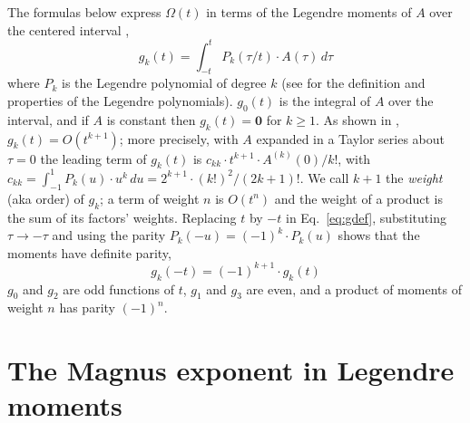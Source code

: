 \documentclass[12pt]{article}
\begin{document}
The formulas below express $\Omega(t)$ in terms of the Legendre moments of $A$ over the centered interval \cite{jtut},
\begin{equation}
g_{k}(t)=\int_{-t}^{t}P_{k}(\tau/t)\cdot A(\tau)\,d\tau\label{eq:gdef}
\end{equation}
where $P_k$ is the Legendre polynomial of degree $k$ (see \cite{jtut} for the definition and properties of the Legendre polynomials). $g_0(t)$ is the integral of $A$ over the interval, and if $A$ is constant then $g_k(t)=\mathbf{0}$ for $k\ge1$. As shown in \cite{jtut}, $g_k(t)=O(t^{k+1})$; more precisely, with $A$ expanded in a Taylor series about $\tau=0$ the leading term of $g_k(t)$ is $c_{kk}\cdot t^{k+1}\cdot A^{(k)}(0)/k!$, with $c_{kk}=\int_{-1}^{1}P_k(u)\cdot u^k\,du=2^{k+1}\cdot(k!)^2/(2k+1)!$. We call $k+1$ the \emph{weight} (aka order) of $g_k$; a term of weight $n$ is $O(t^n)$ and the weight of a product is the sum of its factors' weights. Replacing $t$ by $-t$ in Eq.~\ref{eq:gdef}, substituting $\tau\to-\tau$ and using the parity $P_k(-u)=(-1)^k\cdot P_k(u)$ shows that the moments have definite parity,
\begin{equation}
g_{k}(-t)=(-1)^{k+1}\cdot g_{k}(t)\label{eq:gpar}
\end{equation}
$g_0$ and $g_2$ are odd functions of $t$, $g_1$ and $g_3$ are even, and a product of moments of weight $n$ has parity $(-1)^n$.

\section*{The Magnus exponent in Legendre moments}
\end{document}
